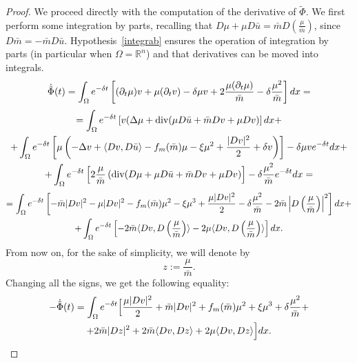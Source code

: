 \documentclass[10pt,a4paper]{amsart}
\newcommand{\R}{\mathbb{R}}
\newcommand{\di}{{\rm d}}
\begin{document}
	\begin{proof}
		We proceed directly with the computation of the derivative of $\tilde{\Phi}$. We first perform some integration by parts, recalling that $D\mu + \mu D\bar{u}= \bar{m}D\left( \frac{\mu}{\bar{m}} \right)$, since $D \bar m = - \bar m D \bar u$. Hypothesis~\eqref{integrab} ensures the operation of integration by parts (in particular when $\Omega = \R^n$) and that derivatives can be moved into integrals.
		\begin{equation*}
			\dot{\tilde{\Phi}}(t)=\int_{\Omega} e^{-\delta t} \left[ (\partial_t \mu) v + \mu (\partial_t v) - \delta \mu v + 2\frac{\mu (\partial_t \mu)}{\bar{m}} - \delta \frac{\mu^2}{\bar{m}} \right] \di x=
		\end{equation*}
		\begin{multline*}
			=\int_{\Omega} e^{-\delta t} \left[ v(\Delta \mu + \text{div}(\mu D\bar{u} + \bar{m}Dv + \mu Dv ) \right] \di x + \\
			+\int_{\Omega} e^{-\delta t} \left[ \mu \left( -\Delta v + \langle Dv,D\bar{u} \rangle - f_m(\bar{m})\mu - \xi \mu^2 + \frac{|Dv|^2}{2} + \delta v \right) \right] - \delta \mu v e^{-\delta t} \di x +  \\
			+ \int_{\Omega} e^{-\delta t} \left[ 2\frac{\mu}{\bar{m}} \left( \text{div}(D\mu + \mu D\bar{u} + \bar{m} Dv + \mu Dv \right) \right] - \delta \frac{\mu^2}{\bar{m}} e^{-\delta t} \di x=
		\end{multline*}
		\begin{multline*}
			=\int_{\Omega} e^{-\delta t} \left[ - \bar{m} |Dv|^2 - \mu |Dv|^2 - f_m(\bar{m})\mu^2 - \xi \mu^3 + \frac{\mu|Dv|^2}{2} - \delta \frac{\mu^2}{\bar{m}} - 2\bar{m} \left| D\left(\frac{\mu}{\bar{m}} \right) \right|^2 \right] \di x +\\
			+\int_{\Omega} e^{-\delta t} \left[- 2 \bar{m} \langle Dv,D\left( \frac{\mu}{\bar{m}} \right) \rangle - 2 \mu \langle Dv,D\left( \frac{\mu}{\bar{m}} \right) \rangle \right] \di x.
		\end{multline*}
		From now on, for the sake of simplicity, we will denote by
		$$z:=\frac{\mu}{\bar{m}}.$$
		Changing all the signs, we get the following equality:
		\begin{multline}
			-\dot{\tilde{\Phi}}(t) = \int_{\Omega} e^{-\delta t} \Big[ \frac{\mu |Dv|^2}{2} + \bar{m}|Dv|^2 +  f_m(\bar{m})\mu^2 + \xi \mu^3 + \delta \frac{\mu^2}{\bar{m}} +\\ + 2\bar{m}|Dz|^2 + 2\bar{m} \langle Dv,Dz \rangle + 2\mu \langle Dv,Dz \rangle \Big] \di x.
			\label{part1}
		\end{multline}

\end{proof}
\end{document}
